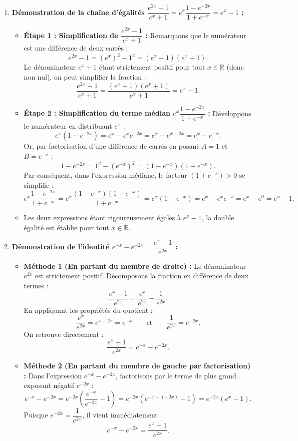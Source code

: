 \documentclass[11pt,a4paper]{article}
\newcommand{\R}{\mathbb{R}}
\begin{document}
\begin{correctionbox}[Exercice 2]
\begin{enumerate}[label=\textbf{\arabic*.}]
    \item \textbf{Démonstration de la chaîne d'égalités $\dfrac{e^{2x} - 1}{e^x + 1} = e^x \dfrac{1 - e^{-2x}}{1 + e^{-x}} = e^x - 1$ :}
    \begin{itemize}
        \item \textbf{Étape 1 : Simplification de $\dfrac{e^{2x} - 1}{e^x + 1}$ :}
        Remarquons que le numérateur est une différence de deux carrés :
        \[
        e^{2x} - 1 = (e^x)^2 - 1^2 = (e^x - 1)(e^x + 1).
        \]
        Le dénominateur $e^x + 1$ étant strictement positif pour tout $x \in \R$ (donc non nul), on peut simplifier la fraction :
        \[
        \frac{e^{2x} - 1}{e^x + 1} = \frac{(e^x - 1)(e^x + 1)}{e^x + 1} = e^x - 1.
        \]
        \item \textbf{Étape 2 : Simplification du terme médian $e^x \dfrac{1 - e^{-2x}}{1 + e^{-x}}$ :}
        Développons le numérateur en distribuant $e^x$ :
        \[
        e^x (1 - e^{-2x}) = e^x - e^x e^{-2x} = e^x - e^{x - 2x} = e^x - e^{-x}.
        \]
        Or, par factorisation d'une différence de carrés en posant $A = 1$ et $B = e^{-x}$ :
        \[
        1 - e^{-2x} = 1^2 - (e^{-x})^2 = (1 - e^{-x})(1 + e^{-x}).
        \]
        Par conséquent, dans l'expression médiane, le facteur $(1 + e^{-x}) > 0$ se simplifie :
        \[
        e^x \frac{1 - e^{-2x}}{1 + e^{-x}} = e^x \frac{(1 - e^{-x})(1 + e^{-x})}{1 + e^{-x}} = e^x (1 - e^{-x}) = e^x - e^x e^{-x} = e^x - e^0 = e^x - 1.
        \]
        \item Les deux expressions étant rigoureusement égales à $e^x - 1$, la double égalité est établie pour tout $x \in \R$.
    \end{itemize}

    \item \textbf{Démonstration de l'identité $e^{-x} - e^{-2x} = \dfrac{e^x - 1}{e^{2x}}$ :}
    \begin{itemize}
        \item \textbf{Méthode 1 (En partant du membre de droite) :}
        Le dénominateur $e^{2x}$ est strictement positif. Décomposons la fraction en différence de deux termes :
        \[
        \frac{e^x - 1}{e^{2x}} = \frac{e^x}{e^{2x}} - \frac{1}{e^{2x}}.
        \]
        En appliquant les propriétés du quotient :
        \[
        \frac{e^x}{e^{2x}} = e^{x - 2x} = e^{-x} \qquad \text{et} \qquad \frac{1}{e^{2x}} = e^{-2x}.
        \]
        On retrouve directement :
        \[
        \frac{e^x - 1}{e^{2x}} = e^{-x} - e^{-2x}.
        \]
        \item \textbf{Méthode 2 (En partant du membre de gauche par factorisation) :}
        Dans l'expression $e^{-x} - e^{-2x}$, factorisons par le terme de plus grand exposant négatif $e^{-2x}$ :
        \[
        e^{-x} - e^{-2x} = e^{-2x}\left(\frac{e^{-x}}{e^{-2x}} - 1\right) = e^{-2x}\left(e^{-x - (-2x)} - 1\right) = e^{-2x}(e^x - 1).
        \]
        Puisque $e^{-2x} = \dfrac{1}{e^{2x}}$, il vient immédiatement :
        \[
        e^{-x} - e^{-2x} = \frac{e^x - 1}{e^{2x}}.
        \]
    \end{itemize}
\end{enumerate}
\end{correctionbox}
\end{document}

